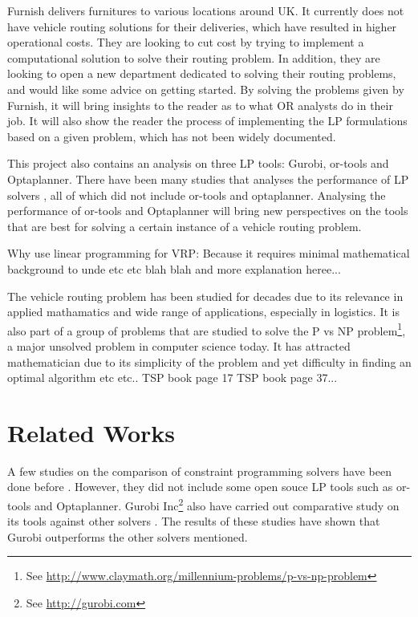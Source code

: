 Furnish delivers furnitures to various locations around UK. It currently does not have vehicle routing solutions for their deliveries, which
have resulted in higher operational costs. They are looking to cut cost by trying to implement a computational solution
to solve their routing problem. In addition, they are looking to open a new department dedicated
to solving their routing problems, and would like some advice on getting started. By solving the problems
given by Furnish, it will bring insights to the reader as to what OR analysts do in their job. It will also show
the reader the process of implementing the LP formulations based on a given problem, which has not been widely documented.

This project also contains an analysis on three LP tools: Gurobi, or-tools and Optaplanner. There have been many studies
that analyses the performance of LP solvers \cite{Meindl2012,gurobi:solvers,Hakan2012}, all of which did not include or-tools
and optaplanner. Analysing the performance of or-tools and Optaplanner will bring new perspectives on the tools that are best
for solving a certain instance of a vehicle routing problem.

Why use linear programming for VRP: Because it requires minimal mathematical background to unde etc etc blah blah
and more explanation heree...

The vehicle routing problem has been studied for decades due to its
relevance in applied mathamatics and wide range of applications, especially in logistics. It is also part of a group of problems
that are studied to solve the P vs NP problem\footnote{See \url{http://www.claymath.org/millennium-problems/p-vs-np-problem}}, a major unsolved problem in computer science today.
It has attracted mathematician due to its simplicity of the problem and yet difficulty in finding an optimal algorithm etc etc.. TSP book page 17
TSP book page 37...

\section{Related Works}
A few studies on the comparison of constraint programming solvers have been done before \cite{Meindl2012,Hakan2012}. However, they did not include some open souce LP tools
such as or-tools and Optaplanner. Gurobi Inc\footnote{See \url{http://gurobi.com}} also have carried out comparative study
on its tools against other solvers \cite{gurobi:solvers}. The results of these studies have shown that Gurobi outperforms the other solvers mentioned.


